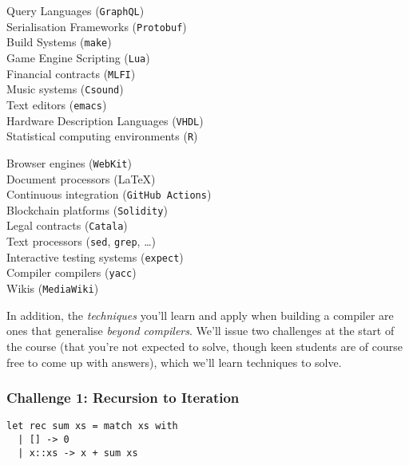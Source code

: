 \begin{minipage}[t]{0.5\textwidth}
Query Languages (\texttt{GraphQL})\\
Serialisation Frameworks (\texttt{Protobuf})\\
Build Systems (\texttt{make})\\
Game Engine Scripting (\texttt{Lua}) \\
Financial contracts (\texttt{MLFI})\\
Music systems (\texttt{Csound}) \\
Text editors (\texttt{emacs})\\
Hardware Description Languages (\texttt{VHDL}) \\
Statistical computing environments (\texttt{R})\\
\end{minipage}%
\begin{minipage}[t]{0.5\textwidth}
Browser engines (\texttt{WebKit})\\
Document processors (\LaTeX)\\
Continuous integration (\texttt{GitHub Actions})\\
Blockchain platforms (\texttt{Solidity})\\
Legal contracts (\texttt{Catala})\\
Text processors (\texttt{sed}, \texttt{grep}, \ldots)\\
Interactive testing systems (\texttt{expect})\\
Compiler compilers (\texttt{yacc})\\
Wikis (\texttt{MediaWiki})
\end{minipage}

In addition, the \emph{techniques} you'll learn and apply when building a compiler are ones that generalise \emph{beyond compilers}. We'll issue two challenges at the start of the course (that you're not expected to solve, though keen students are of course free to come up with answers), which we'll learn techniques to solve.

\subsubsection{Challenge 1: Recursion to Iteration}
\begin{code}
\label{code:cps-challenge}
\begin{verbatim}
let rec sum xs = match xs with
  | [] -> 0
  | x::xs -> x + sum xs
\end{verbatim}
\end{code}

